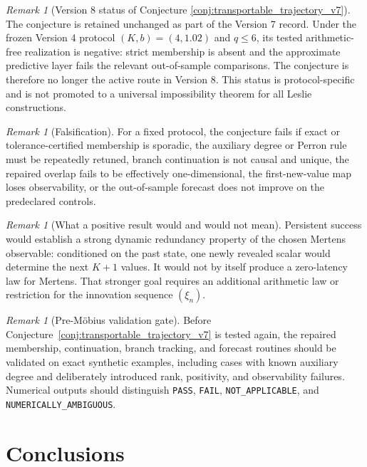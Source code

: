 \documentclass[11pt]{amsart}
\numberwithin{equation}{section}
\theoremstyle{plain}
\theoremstyle{definition}
\theoremstyle{remark}
\newtheorem{remark}[theorem]{Remark}
\begin{document}
\begin{remark}[Version 8 status of Conjecture \ref{conj:transportable_trajectory_v7}]
\label{rem:v8_status_old_conjecture}
The conjecture is retained unchanged as part of the Version 7 record.  Under the frozen
Version 4 protocol $(K,b)=(4,1.02)$ and $q\le6$, its tested arithmetic-free realization is
negative: strict membership is absent and the approximate predictive layer fails the relevant
out-of-sample comparisons.  The conjecture is therefore no longer the active route in
Version 8.  This status is protocol-specific and is not promoted to a universal impossibility
theorem for all Leslie constructions.
\end{remark}

\begin{remark}[Falsification]
\label{rem:falsification_v7}
For a fixed protocol, the conjecture fails if exact or tolerance-certified membership is sporadic, the auxiliary degree or Perron rule must be repeatedly retuned, branch continuation is not causal and unique, the repaired overlap fails to be effectively one-dimensional, the first-new-value map loses observability, or the out-of-sample forecast does not improve on the predeclared controls.
\end{remark}

\begin{remark}[What a positive result would and would not mean]
\label{rem:success_v7}
Persistent success would establish a strong dynamic redundancy property of the chosen Mertens observable: conditioned on the past state, one newly revealed scalar would determine the next $K+1$ values. It would not by itself produce a zero-latency law for Mertens. That stronger goal requires an additional arithmetic law or restriction for the innovation sequence $(\xi_n)$.
\end{remark}

\begin{remark}[Pre-M\"obius validation gate]
\label{rem:premobius_gate}
Before Conjecture~\ref{conj:transportable_trajectory_v7} is tested again, the repaired membership, continuation, branch tracking, and forecast routines should be validated on exact synthetic examples, including cases with known auxiliary degree and deliberately introduced rank, positivity, and observability failures. Numerical outputs should distinguish \texttt{PASS}, \texttt{FAIL}, \texttt{NOT\_APPLICABLE}, and \texttt{NUMERICALLY\_AMBIGUOUS}.
\end{remark}

\section{Conclusions}
\label{sec:conclusions}
\end{document}
